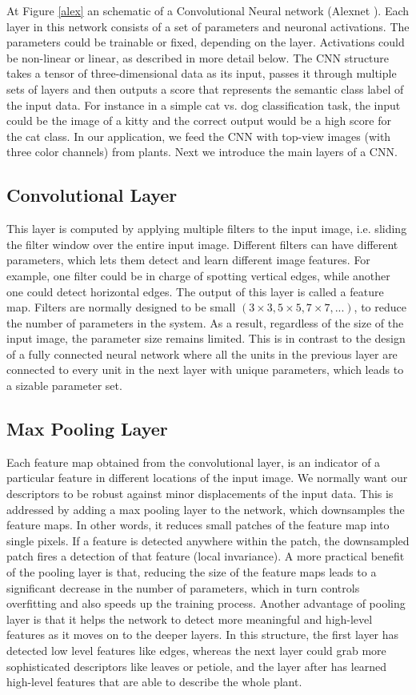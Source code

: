 \documentclass[12pt]{article}
\numberwithin{equation}{section}
\numberwithin{table}{section}
\numberwithin{figure}{section}
\begin{document}
At Figure \ref{alex} an schematic of a Convolutional Neural network (Alexnet \cite{Krizhevsky2012}). Each layer in this network consists of a set of parameters and neuronal activations. The parameters could be trainable or fixed, depending on the layer. Activations could be non-linear or linear, as described in more detail below. The CNN structure takes a tensor of three-dimensional data as its input, passes it through multiple sets of layers and then outputs a score that represents the semantic class label of the input data. For instance in a simple cat vs. dog classification task, the input could be the image of a kitty and the correct output would be a high score for the cat class. In our application, we feed the CNN with top-view images (with three color channels) from plants. Next we introduce the main layers of a CNN.


\subsection{Convolutional Layer}
This layer is computed by applying multiple filters to the input image, i.e.
sliding the filter window over the entire input image. Different filters can
have different parameters, which lets them detect and learn different image
features. For example, one filter could be in charge of spotting vertical edges,
while another one could detect horizontal edges. The output of this layer is
called a feature map.
Filters are normally designed to be small $(3 × 3, 5 × 5, 7 × 7, . . . )$, to
reduce the number of parameters in the system. As a result, regardless of
the size of the input image, the parameter size remains limited. This is in
contrast to the design of a fully connected neural network where all the units
in the previous layer are connected to every unit in the next layer with unique
parameters, which leads to a sizable parameter set.

\subsection{Max Pooling Layer}
Each feature map obtained from the convolutional layer, is an indicator of
a particular feature in different locations of the input image. We normally
want our descriptors to be robust against minor displacements of the input
data. This is addressed by adding a max pooling layer to the network, which
downsamples the feature maps. In other words, it reduces small patches of
the feature map into single pixels. If a feature is detected anywhere within
the patch, the downsampled patch fires a detection of that feature (local
invariance).
A more practical benefit of the pooling layer is that, reducing the size of
the feature maps leads to a significant decrease in the number of parameters,
which in turn controls overfitting and also speeds up the training process.
Another advantage of pooling layer is that it helps the network to detect
more meaningful and high-level features as it moves on to the deeper layers.
In this structure, the first layer has detected low level features like edges,
whereas the next layer could grab more sophisticated descriptors like leaves
or petiole, and the layer after has learned high-level features that are able to
describe the whole plant.
\end{document}
